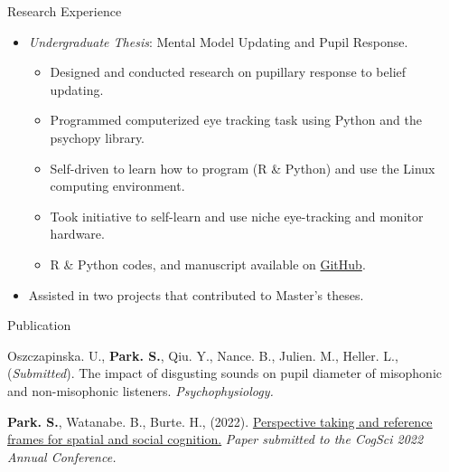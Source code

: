 \documentclass{resume} %
\begin{document}
\begin{rSection}{Research Experience}
    \begin{itemize}[nosep]
        
        \item \emph{Undergraduate Thesis}: 
        Mental Model Updating and Pupil Response.
            \begin{itemize}
                \item Designed and conducted research on pupillary response to 
                belief updating.
                \item Programmed computerized eye tracking task using Python and the psychopy library.
                \item Self-driven to learn how to program (R \& Python) and use the Linux computing environment.
                \item Took initiative to self-learn and use niche eye-tracking and monitor hardware.
                \item R \& Python codes, and manuscript available on \href{https://github.com/sjp117/Undergrad_Projects/tree/master/mentalModelUpdatingPupil}{GitHub}.
            \end{itemize}
        \item Assisted in two projects that contributed to Master's theses.
        
    \end{itemize}
    
\end{rSection}



\begin{rSection}{Publication}
	\setlength{\hangingindent}{1.27cm}
	
	\begin{hangingpar}
		
		Oszczapinska. U., \textbf{Park. S.}, Qiu. Y., Nance. B., Julien. M., Heller. L., (\textit{Submitted}). 
		The impact of disgusting sounds on pupil diameter of misophonic and non-misophonic listeners.
		\textit{Psychophysiology.}
		
		
	\end{hangingpar}
	
	\begin{hangingpar}
		
		\textbf{Park. S.}, Watanabe. B., Burte. H., (2022). 
		\href{https://escholarship.org/uc/item/6wq5x6nn}{Perspective taking and reference frames for spatial and social cognition.} 
		\em{Paper submitted to the CogSci 2022 Annual Conference.}
		
	\end{hangingpar}
	
\end{rSection}
\end{document}
